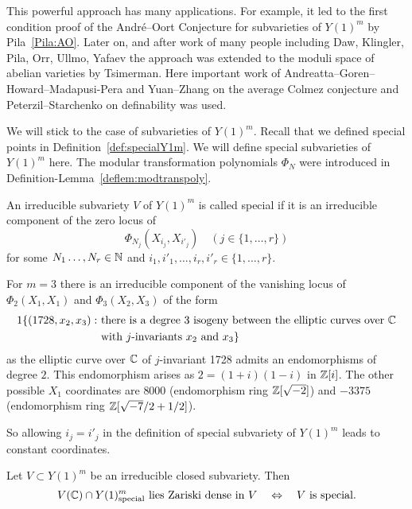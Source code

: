 This powerful approach has many applications. For example, it led to
the first condition proof of the Andr\'e--Oort Conjecture for
subvarieties of $Y(1)^m$ by Pila~\ref{Pila:AO}. Later on, and after work of
many people including Daw, Klingler, Pila, Orr, Ullmo, Yafaev the
approach was extended to the moduli space of abelian varieties by
Tsimerman. Here important work of
Andreatta--Goren--Howard--Madapusi-Pera and Yuan--Zhang on the average
Colmez conjecture and Peterzil--Starchenko on definability was used.

We will stick to the case of subvarieties of $Y(1)^m$.
Recall that we defined special points in
Definition~\ref{def:specialY1m}. We will define special subvarieties
of $Y(1)^m$ here. The modular transformation polynomials $\Phi_N$
were introduced in Definition-Lemma~\ref{deflem:modtranspoly}. 

\begin{definition}
  An irreducible subvariety $V$ of $Y(1)^m$ is called special if it is
  an irreducible component of the zero locus of
  \begin{equation*}
    \Phi_{N_j}(X_{i_j},X_{i'_j}) \quad (j\in \{1,\ldots,r\})
  \end{equation*}
  for some  $N_1\ldots,N_r\in{\mathbb{N}}$ and $i_1,i'_1,\ldots,i_r,i'_r\in
  \{1,\ldots,r\}$. 
\end{definition}

\begin{example}
  For $m=3$ there is an irreducible component of the vanishing locus of
  $\Phi_2(X_1,X_1)$ and $\Phi_3(X_2,X_3)$ of the form
  \begin{alignat*}1
    \{(1728,x_2,x_3) : \,\,&\text{there is a degree $3$ isogeny between
      the elliptic curves over $\IC$}\\ &\text{with $j$-invariants $x_2$ and $x_3$}\}
  \end{alignat*}
  as the elliptic curve over ${\mathbb{C}}$  of $j$-invariant 1728
  admits an endomorphisms of degree $2$. This endomorphism arises as
  $2 = (1+i)(1-i)$ in ${\mathbb{Z}}[i]$. The other possible $X_1$ 
  coordinates are $8000$ (endomorphism ring ${\mathbb{Z}}[\sqrt{-2}]$) and
  $-3375$ (endomorphism ring ${\mathbb{Z}}[\sqrt{-7}/2+1/2]$).

  So allowing $i_j=i'_j$ in the definition of special subvariety of
  $Y(1)^m$ leads to constant coordinates. 
\end{example}

\begin{theorem}
  \label{thm:ao}
  Let $V\subset Y(1)^m$ be an irreducible closed subvariety. Then
  \begin{equation*}
    V({\mathbb{C}}) \cap Y(1)^m_{\mathrm{special}} \text{ lies Zariski dense in
      $V$}\quad\Leftrightarrow \quad
    \text{$V$ is special.}
  \end{equation*}    
\end{theorem}

